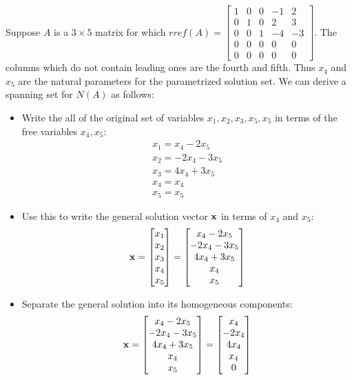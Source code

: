 \documentclass{ximera}
\begin{document}
\begin{example}
Suppose $A$ is a $3\times 5$ matrix for which $rref(A) = 
\begin{bmatrix} 1 & 0 & 0 & -1 & 2\\0 & 1 & 0 & 2 & 3\\0 & 0 & 1 & -4 & -3\\
0 & 0 & 0 & 0 & 0\\0 & 0 & 0 & 0 & 0\end{bmatrix}$. The columns which do not contain leading ones are the fourth and fifth. Thus $x_4$ and $x_5$ are the natural parameters for the parametrized solution set. We can derive a spanning set for $N(A)$ as follows:
\begin{itemize}
\item Write the all of the original set of variables $x_1, x_2, x_3, x_5, x_5$ in terms of the free variables $x_4, x_5$:
\begin{gather*}
x_1 = x_4 - 2x_5\\
x_2 = -2x_4 - 3x_5\\
x_3 = 4x_4 + 3x_5\\
x_4 = x_4\\
x_5 = x_5
\end{gather*}
\item Use this to write the general solution vector $\bf x$ in terms of $x_4$ and $x_5$:
\[
{\bf x} = \begin{bmatrix}x_1\\x_2\\x_3\\x_4\\x_5\end{bmatrix} =
\begin{bmatrix}x_4 - 2x_5\\-2x_4 -3x_5\\4x_4 + 3x_5\\x_4\\x_5\end{bmatrix}
\]
\item Separate the general solution into its homogeneous components:
\[
{\bf x} = \begin{bmatrix}x_4 - 2x_5\\-2x_4 -3x_5\\4x_4 + 3x_5\\x_4\\x_5\end{bmatrix}
= \begin{bmatrix}x_4\\-2x_4\\4x_4\\x_4\\0\end{bmatrix}
\]
\end{itemize}
\end{example}
\end{document}
